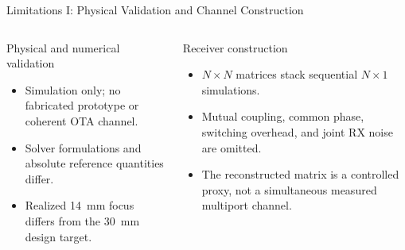 \begin{frame}[t]{Limitations I: Physical Validation and Channel Construction}
\scriptsize
\begin{columns}[T,onlytextwidth]
  \begin{block}{Physical and numerical validation}
    \begin{itemize}
      \setlength{\itemsep}{0.15em}
      \item Simulation only; no fabricated prototype or coherent OTA channel.
      \item Solver formulations and absolute reference quantities differ.
      \item Realized 14~mm focus differs from the 30~mm design target.
    \end{itemize}
  \end{block}

  \begin{block}{Receiver construction}
    \begin{itemize}
      \setlength{\itemsep}{0.15em}
      \item $N\times N$ matrices stack sequential $N\times1$ simulations.
      \item Mutual coupling, common phase, switching overhead, and joint RX
            noise are omitted.
      \item The reconstructed matrix is a controlled proxy, not a simultaneous
            measured multiport channel.
    \end{itemize}
  \end{block}
\end{columns}
\end{frame}


